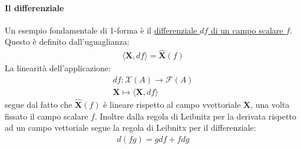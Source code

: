 \paragraph{Il differenziale} Un esempio fondamentale di 1-forma è il \underline{differenziale $df$ di un campo scalare $f$}.\\
Questo è definito dall'uguaglianza:
\begin{align*}
    \langle \mathbf{X},df\rangle = \hat{\mathbf{X}}(f)
\end{align*}
La linearità dell'applicazione:
\begin{align*}
    df\colon \mathcal{X}(A)\to \mathcal{F}(A)\\
    \mathbf{X}\mapsto \langle \mathbf{X},df\rangle 
\end{align*}
segue dal fatto che $\hat{\mathbf{X}}(f)$ è lineare rispetto al campo vvettoriale $\mathbf{X}$, una volta fissato il campo scalare $f$. Inoltre dalla regola di Leibnitz per la derivata rispetto ad un campo vettoriale segue la regola di Leibnitx per il differenziale:
\begin{align*}
    d(fg)=gdf+fdg
\end{align*}
